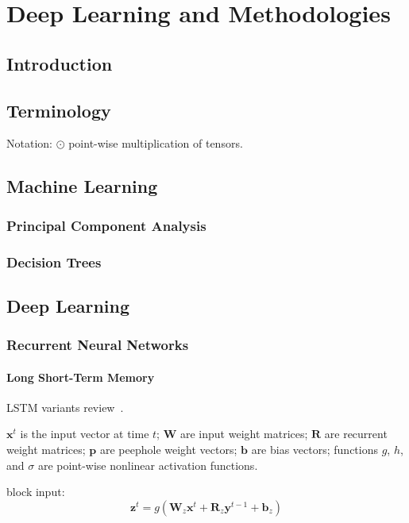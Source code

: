\chapter{Deep Learning and Methodologies}

\section{Introduction}

\section{Terminology}

Notation: $\odot$ point-wise multiplication of tensors.

\section{Machine Learning}

\subsection{Principal Component Analysis}

\subsection{Decision Trees}

\section{Deep Learning}

\subsection{Recurrent Neural Networks}

\subsubsection{Long Short-Term Memory}

LSTM variants review~\cite{Greff2015}.

$\bm{x}^t$ is the input vector at time $t$; $\bm{W}$ are input weight matrices; $\bm{R}$ are recurrent weight matrices; $\bm{p}$ are peephole weight vectors; $\bm{b}$ are bias vectors; functions $g$, $h$, and $\sigma$ are point-wise nonlinear activation functions.

block input:
\[ \bm{z}^{t} = g \left( \bm{W}_z \bm{x}^t + \bm{R}_z \bm{y}^{t - 1} + \bm{b}_z \right) \]

